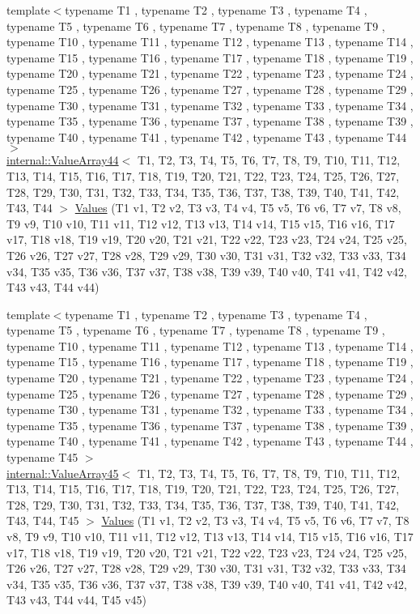 \begin{DoxyCompactItemize}
\item 
{\footnotesize template$<$typename T1 , typename T2 , typename T3 , typename T4 , typename T5 , typename T6 , typename T7 , typename T8 , typename T9 , typename T10 , typename T11 , typename T12 , typename T13 , typename T14 , typename T15 , typename T16 , typename T17 , typename T18 , typename T19 , typename T20 , typename T21 , typename T22 , typename T23 , typename T24 , typename T25 , typename T26 , typename T27 , typename T28 , typename T29 , typename T30 , typename T31 , typename T32 , typename T33 , typename T34 , typename T35 , typename T36 , typename T37 , typename T38 , typename T39 , typename T40 , typename T41 , typename T42 , typename T43 , typename T44 $>$ }\\\mbox{\hyperlink{classtesting_1_1internal_1_1_value_array44}{internal\+::\+Value\+Array44}}$<$ T1, T2, T3, T4, T5, T6, T7, T8, T9, T10, T11, T12, T13, T14, T15, T16, T17, T18, T19, T20, T21, T22, T23, T24, T25, T26, T27, T28, T29, T30, T31, T32, T33, T34, T35, T36, T37, T38, T39, T40, T41, T42, T43, T44 $>$ \mbox{\hyperlink{namespacetesting_a42848f3794e196c5a74f4b21db0752dd}{Values}} (T1 v1, T2 v2, T3 v3, T4 v4, T5 v5, T6 v6, T7 v7, T8 v8, T9 v9, T10 v10, T11 v11, T12 v12, T13 v13, T14 v14, T15 v15, T16 v16, T17 v17, T18 v18, T19 v19, T20 v20, T21 v21, T22 v22, T23 v23, T24 v24, T25 v25, T26 v26, T27 v27, T28 v28, T29 v29, T30 v30, T31 v31, T32 v32, T33 v33, T34 v34, T35 v35, T36 v36, T37 v37, T38 v38, T39 v39, T40 v40, T41 v41, T42 v42, T43 v43, T44 v44)
\item 
{\footnotesize template$<$typename T1 , typename T2 , typename T3 , typename T4 , typename T5 , typename T6 , typename T7 , typename T8 , typename T9 , typename T10 , typename T11 , typename T12 , typename T13 , typename T14 , typename T15 , typename T16 , typename T17 , typename T18 , typename T19 , typename T20 , typename T21 , typename T22 , typename T23 , typename T24 , typename T25 , typename T26 , typename T27 , typename T28 , typename T29 , typename T30 , typename T31 , typename T32 , typename T33 , typename T34 , typename T35 , typename T36 , typename T37 , typename T38 , typename T39 , typename T40 , typename T41 , typename T42 , typename T43 , typename T44 , typename T45 $>$ }\\\mbox{\hyperlink{classtesting_1_1internal_1_1_value_array45}{internal\+::\+Value\+Array45}}$<$ T1, T2, T3, T4, T5, T6, T7, T8, T9, T10, T11, T12, T13, T14, T15, T16, T17, T18, T19, T20, T21, T22, T23, T24, T25, T26, T27, T28, T29, T30, T31, T32, T33, T34, T35, T36, T37, T38, T39, T40, T41, T42, T43, T44, T45 $>$ \mbox{\hyperlink{namespacetesting_a227b4b3b251f5f4aa0e1261c27fe9dd4}{Values}} (T1 v1, T2 v2, T3 v3, T4 v4, T5 v5, T6 v6, T7 v7, T8 v8, T9 v9, T10 v10, T11 v11, T12 v12, T13 v13, T14 v14, T15 v15, T16 v16, T17 v17, T18 v18, T19 v19, T20 v20, T21 v21, T22 v22, T23 v23, T24 v24, T25 v25, T26 v26, T27 v27, T28 v28, T29 v29, T30 v30, T31 v31, T32 v32, T33 v33, T34 v34, T35 v35, T36 v36, T37 v37, T38 v38, T39 v39, T40 v40, T41 v41, T42 v42, T43 v43, T44 v44, T45 v45)

\end{DoxyCompactItemize}
